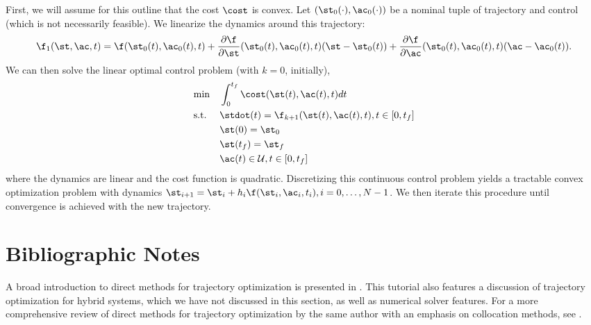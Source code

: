 First, we will assume for this outline that the cost $\cost$ is convex. Let $(\st_0(\cdot),\ac_0(\cdot))$ be a nominal tuple of trajectory and control (which is not necessarily feasible). We linearize the dynamics around this trajectory:
\begin{equation}
    \f_1(\st,\ac,t) = \f(\st_0(t),\ac_0(t),t) + \frac{\partial \f}{\partial \st}(\st_0(t), \ac_0(t), t) (\st - \st_0(t)) + \frac{\partial \f}{\partial \ac}(\st_0(t), \ac_0(t), t) (\ac - \ac_0(t)).
\end{equation}
We can then solve the linear optimal control problem (with $k=0$, initially),
\begin{equation}
\begin{aligned}
\label{eq:ocp}
& {\min} & & \int_{0}^{t_f} \cost(\st(t),\ac(t),t) dt\\
& \textrm{s.t.} & & \stdot(t) = \f_{k+1}(\st(t),\ac(t),t), t \in [0,t_f]\\
& & & \st(0) = \st_0\\
& & & \st(t_f) = \st_f\\
& & & \ac(t) \in \mathcal{U}, t \in [0,t_f]
\end{aligned}
\end{equation}
where the dynamics are linear and the cost function is quadratic. Discretizing this continuous control problem yields a tractable convex optimization problem with dynamics $\st_{i+1} = \st_i + h_i \f(\st_i,\ac_i,t_i), i=0, \ldots, N-1$. We then iterate this procedure until convergence is achieved with the new trajectory.




\section{Bibliographic Notes}

A broad introduction to direct methods for trajectory optimization is presented in \cite{kelly2017transcription}. This tutorial also features a discussion of trajectory optimization for hybrid systems, which we have not discussed in this section, as well as numerical solver features. For a more comprehensive review of direct methods for trajectory optimization by the same author with an emphasis on collocation methods, see \cite{kelly2017introduction}.